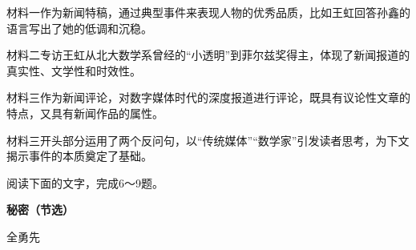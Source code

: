 \documentclass[11pt,a4paper]{ctexart}
\begin{document}
\begin{choices}
\item 材料一作为新闻特稿，通过典型事件来表现人物的优秀品质，比如王虹回答孙鑫的语言写出了她的低调和沉稳。
\item 材料二专访王虹从北大数学系曾经的“小透明”到菲尔兹奖得主，体现了新闻报道的真实性、文学性和时效性。
\item 材料三作为新闻评论，对数字媒体时代的深度报道进行评论，既具有议论性文章的特点，又具有新闻作品的属性。
\item 材料三开头部分运用了两个反问句，以“传统媒体”“数学家”引发读者思考，为下文揭示事件的本质奠定了基础。
\end{choices}


\par\vspace{2.2em}


\par\vspace{2.2em}

阅读下面的文字，完成6～9题。

\begin{center}{\bfseries 秘密（节选）}\par\vspace{0.15em}全勇先\end{center}
\end{document}
